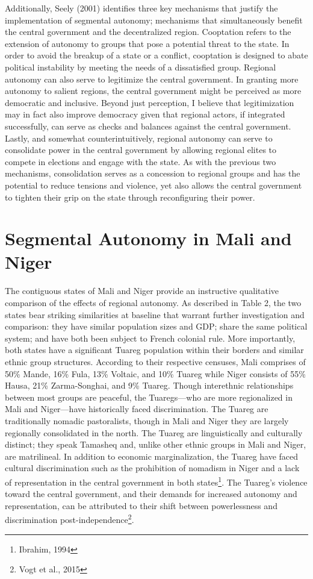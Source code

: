 \documentclass[12pt]{article}
\begin{document}
Additionally, Seely (2001) identifies three key mechanisms that justify the implementation of segmental autonomy; mechanisms that simultaneously benefit the central government and the decentralized region. Cooptation refers to the extension of autonomy to groups that pose a potential threat to the state. In order to avoid the breakup of a state or a conflict, cooptation is designed to abate political instability by meeting the needs of a dissatisfied group. Regional autonomy can also serve to legitimize the central government. In granting more autonomy to salient regions, the central government might be perceived as more democratic and inclusive. Beyond just perception, I believe that legitimization may in fact also improve democracy given that regional actors, if integrated successfully, can serve as checks and balances against the central government. Lastly, and somewhat counterintuitively, regional autonomy can serve to consolidate power in the central government by allowing regional elites to compete in elections and engage with the state. As with the previous two mechanisms, consolidation serves as a concession to regional groups and has the potential to reduce tensions and violence, yet also allows the central government to tighten their grip on the state through reconfiguring their power. 

\section{Segmental Autonomy in Mali and Niger}
The contiguous states of Mali and Niger provide an instructive qualitative comparison of the effects of regional autonomy. As described in Table 2, the two states bear striking similarities at baseline that warrant further investigation and comparison: they have similar population sizes and GDP; share the same political system; and have both been subject to French colonial rule. More importantly, both states have a significant Tuareg population within their borders and similar ethnic group structures. According to their respective censuses, Mali comprises of 50\% Mande, 16\% Fula, 13\% Voltaic, and 10\% Tuareg while Niger consists of 55\% Hausa, 21\% Zarma-Songhai, and 9\% Tuareg. Though interethnic relationships between most groups are peaceful, the Tuaregs---who are more regionalized in Mali and Niger---have historically faced discrimination. The Tuareg are traditionally nomadic pastoralists, though in Mali and Niger they are largely regionally consolidated in the north. The Tuareg are linguistically and culturally distinct; they speak Tamasheq and, unlike other ethnic groups in Mali and Niger, are matrilineal. In addition to economic marginalization, the Tuareg have faced cultural discrimination such as the prohibition of nomadism in Niger and a lack of representation in the central government in both states\footnote{Ibrahim, 1994}. The Tuareg's violence toward the central government, and their demands for increased autonomy and representation, can be attributed to their shift between powerlessness and discrimination post-independence\footnote{Vogt et al., 2015}.  
\end{document}
